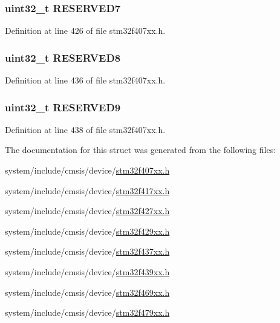 \subsubsection[{\texorpdfstring{R\+E\+S\+E\+R\+V\+E\+D7}{RESERVED7}}]{\setlength{\rightskip}{0pt plus 5cm}uint32\+\_\+t R\+E\+S\+E\+R\+V\+E\+D7}\hypertarget{struct_e_t_h___type_def_ac543ad31a23d58a5a27670125e5d70fa}{}\label{struct_e_t_h___type_def_ac543ad31a23d58a5a27670125e5d70fa}


Definition at line 426 of file stm32f407xx.\+h.

\subsubsection[{\texorpdfstring{R\+E\+S\+E\+R\+V\+E\+D8}{RESERVED8}}]{ uint32\+\_\+t R\+E\+S\+E\+R\+V\+E\+D8}\hypertarget{struct_e_t_h___type_def_a2e60bc2eefc18398fb2459d1b44453e5}{}\label{struct_e_t_h___type_def_a2e60bc2eefc18398fb2459d1b44453e5}


Definition at line 436 of file stm32f407xx.\+h.

\subsubsection[{\texorpdfstring{R\+E\+S\+E\+R\+V\+E\+D9}{RESERVED9}}]{\setlength{\rightskip}{0pt plus 5cm}uint32\+\_\+t R\+E\+S\+E\+R\+V\+E\+D9}\hypertarget{struct_e_t_h___type_def_a834642c6a34a5fdc23cd696a4a0410bd}{}\label{struct_e_t_h___type_def_a834642c6a34a5fdc23cd696a4a0410bd}


Definition at line 438 of file stm32f407xx.\+h.



The documentation for this struct was generated from the following files\+:\begin{DoxyCompactItemize}
\item 
system/include/cmsis/device/\hyperlink{stm32f407xx_8h}{stm32f407xx.\+h}\item 
system/include/cmsis/device/\hyperlink{stm32f417xx_8h}{stm32f417xx.\+h}\item 
system/include/cmsis/device/\hyperlink{stm32f427xx_8h}{stm32f427xx.\+h}\item 
system/include/cmsis/device/\hyperlink{stm32f429xx_8h}{stm32f429xx.\+h}\item 
system/include/cmsis/device/\hyperlink{stm32f437xx_8h}{stm32f437xx.\+h}\item 
system/include/cmsis/device/\hyperlink{stm32f439xx_8h}{stm32f439xx.\+h}\item 
system/include/cmsis/device/\hyperlink{stm32f469xx_8h}{stm32f469xx.\+h}\item 
system/include/cmsis/device/\hyperlink{stm32f479xx_8h}{stm32f479xx.\+h}\end{DoxyCompactItemize}
